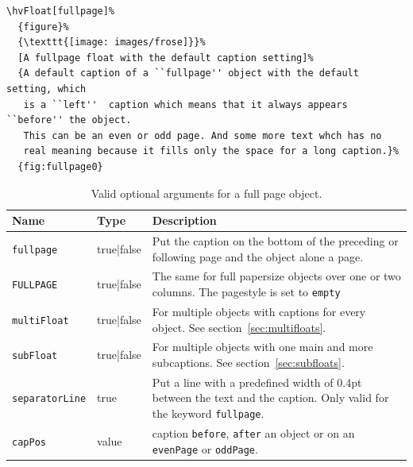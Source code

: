 \documentclass[twoside,paper=a4,usegeometry]{scrartcl}
\makeatletter
\def\Lkeyword#1{\texttt{#1}\index{#1@\texttt{#1} (keyword)}}
\def\Lkeyval#1{\texttt{#1}\index{#1@\texttt{#1} (value)}}
\makeatother
\begin{document}
\begin{lstlisting}
\hvFloat[fullpage]%
  {figure}%
  {\texttt{[image: images/frose]}}%
  [A fullpage float with the default caption setting]%
  {A default caption of a ``fullpage'' object with the default setting, which
   is a ``left''  caption which means that it always appears ``before'' the object.
   This can be an even or odd page. And some more text whch has no
   real meaning because it fills only the space for a long caption.}%
  {fig:fullpage0}
\end{lstlisting}






\begin{table}[!h]
\caption{Valid optional arguments for a full page object.}\label{tab:fullpage}
\centering
 \begin{tabularx}{\linewidth}{>{\small\ttfamily}l|>{\small\ttfamily}l|X}\toprule
  \rmfamily Name    & \rmfamily Type        & Description\\\midrule
\Lkeyword{fullpage} & true|false & Put the caption on the bottom of the preceding or following page and the object alone a page.\\


\Lkeyword{FULLPAGE} & true|false & The same for full papersize objects over one or two columns. 
The pagestyle is set to \texttt{empty}\\

\Lkeyword{multiFloat} & true|false & For multiple objects with captions for every object. See section~\vref{sec:multifloats}.\\

\Lkeyword{subFloat} & true|false & For multiple objects with one main and more subcaptions. See section~\vref{sec:subfloats}.\\

\Lkeyword{separatorLine} & true & Put a line with a predefined width of 0.4pt between
    the text and the caption. Only valid for the keyword \Lkeyword{fullpage}.\\
\Lkeyword{capPos}  & value
	 & caption \Lkeyval{before}, \Lkeyval{after} an object or on an
		    \Lkeyval{evenPage} or \Lkeyval{oddPage}.\\
\bottomrule
 \end{tabularx}%
\end{table}
\end{document}
